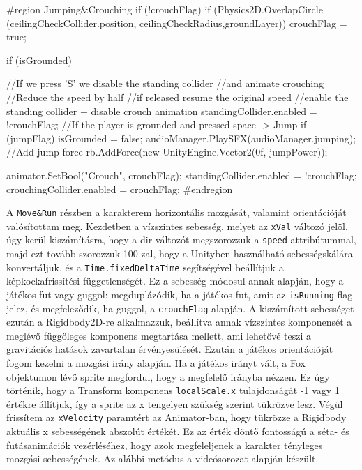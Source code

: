 \begin{java}
#region Jumping&Crouching
if (!crouchFlag)
{
    if (Physics2D.OverlapCircle
        (ceilingCheckCollider.position,
        ceilingCheckRadius,groundLayer))
    {
        crouchFlag = true;
    }
}

if (isGrounded)
{
    //If we press 'S' we disable the standing collider
    //and animate crouching
    //Reduce the speed by half
    //if released resume the original speed
    //enable the standing collider + disable crouch animation
    standingCollider.enabled = !crouchFlag;
    //If the player is grounded and pressed space -> Jump
    if (jumpFlag)
    {
        isGrounded = false;
        audioManager.PlaySFX(audioManager.jumping);
        //Add jump force
        rb.AddForce(new UnityEngine.Vector2(0f, jumpPower));
    }
    
}

animator.SetBool("Crouch", crouchFlag);
standingCollider.enabled = !crouchFlag;
crouchingCollider.enabled = crouchFlag;
#endregion
\end{java}

A \texttt{Move\&Run} részben a karakterem horizontális mozgását, valamint orientációját valósítottam meg. Kezdetben a vízszintes sebesség, melyet az \texttt{xVal} változó jelöl, úgy kerül kiszámításra, hogy a dir változót megszorozzuk a \texttt{speed} attribútummal, majd ezt tovább szorozzuk 100-zal, hogy a Unityben használható sebességskálára konvertáljuk, és a \texttt{Time.fixedDeltaTime} segítségével beállítjuk a képkockafrissítési függetlenségét. Ez a sebesség módosul annak alapján, hogy a játékos fut vagy guggol: megduplázódik, ha a játékos fut, amit az \texttt{isRunning} flag jelez, és megfeleződik, ha guggol, a \texttt{crouchFlag} alapján. A kiszámított sebességet ezután a Rigidbody2D-re alkalmazzuk, beállítva annak vízszintes komponensét a meglévő függőleges komponens megtartása mellett, ami lehetővé teszi a gravitációs hatások zavartalan érvényesülését. Ezután a játékos orientációját fogom kezelni a mozgási irány alapján. Ha a játékos irányt vált, a Fox objektumon lévő sprite megfordul, hogy a megfelelő irányba nézzen. Ez úgy történik, hogy a Transform komponens \texttt{localScale.x} tulajdonságát -1 vagy 1 értékre állítjuk, így a sprite az x tengelyen szükség szerint tükrözve lesz. Végül frissítem az \texttt{xVelocity} paramtért az Animator-ban, hogy tükrözze a Rigidbody aktuális x sebességének abszolút értékét. Ez az érték döntő fontosságú a séta- és futásanimációk vezérléséhez, hogy azok megfeleljenek a karakter tényleges mozgási sebességének. Az alábbi metódus a \cite{youtubeplaylist} videósorozat alapján készült.

